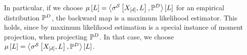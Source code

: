 In particular, if we choose $\mu\left[L\right]=\left\langle \sigma^{\mathcal{S}}\left[X_{[d]},L\right],\mathbb{P}^{D}\right\rangle \left[ L \right]$ for an empirical distribution $\mathbb{P}^{D}$, the backward map is a maximum likelihood estimator.
This holds, since by  maximum likelihood estimation is a special instance of moment projection, when projecting $\mathbb{P}^{D}$.
In that case, we choose $\mu\left[L\right]=\left\langle \sigma^{\mathcal{S}}\left[X_{[d]},L\right],\mathbb{P}^{D}\right\rangle \left[ L \right]$.




